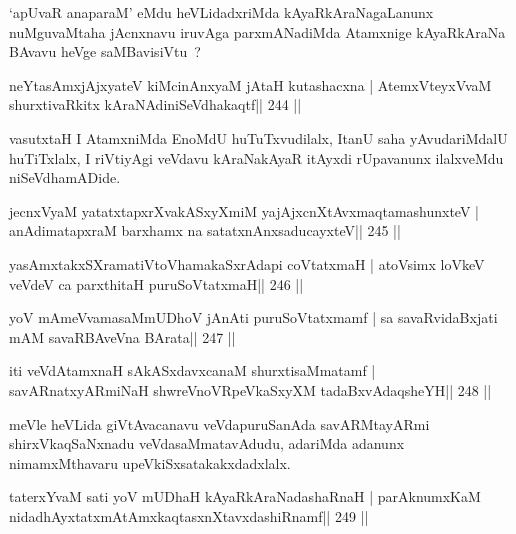 \begin{artha}
`apUvaR anaparaM' eMdu heVLidadxriMda kAyaRkAraNagaLanunx nuMguvaMtaha jAcnxnavu iruvAga parxmANadiMda Atamxnige kAyaRkAraNa BAvavu heVge saMBavisiVtu~?
\end{artha}

\begin{shl}
neYtasAmxjAjxyateV kiMcinAnxyaM jAtaH kutashacxna |
AtemxVteyxVvaM shurxtivaRkitx kAraNAdiniSeVdhakaqtf\hfill || 244 ||
\end{shl}

\begin{artha}
vasutxtaH I AtamxniMda EnoMdU huTuTxvudilalx, ItanU saha yAvudariMdalU huTiTxlalx, I riVtiyAgi veVdavu kAraNakAyaR itAyxdi rUpavanunx ilalxveMdu niSeVdhamADide.
\end{artha}


\begin{shl}
jecnxVyaM yatatxtapxrXvakASxyXmiM yajAjxcnXtAvx\s maqtamashunxteV |
anAdimatapxraM barxhamx na satatxnAnxsaducayxteV\hfill || 245 ||
\end{shl}

\begin{shl}
yasAmxtakxSXramatiVtoV\s hamakaSxrAdapi coVtatxmaH |
atoV\s simx loVkeV veVdeV ca parxthitaH puruSoVtatxmaH\hfill || 246 ||
\end{shl}

\begin{shl}
yoV mAmeVvamasaMmUDhoV jAnAti puruSoVtatxmamf |
sa savaRvidaBxjati mAM savaRBAveVna BArata\hfill || 247 ||
\end{shl}

\begin{shl}
iti veVdAtamxnaH sAkASxdavxcanaM shurxtisaMmatamf |
savARnatxyARmiNaH shwreVnoVRpeVkaSxyXM tadaBxvAdaqsheYH\hfill || 248 ||
\end{shl}

\begin{artha}
meVle heVLida giVtAvacanavu veVdapuruSanAda savARMtayARmi shirxVkaqSaNxnadu veVdasaMmatavAdudu, adariMda adanunx nimamxMthavaru upeVkiSxsatakakxdadxlalx.
\end{artha}


\begin{shl}
taterxYvaM sati yoV mUDhaH kAyaRkAraNadashaRnaH |
parAknumxKaM nidadhAyxtatxmAtAmxkaqtasxnXtavxdashiRnamf\hfill || 249 ||
\end{shl}

